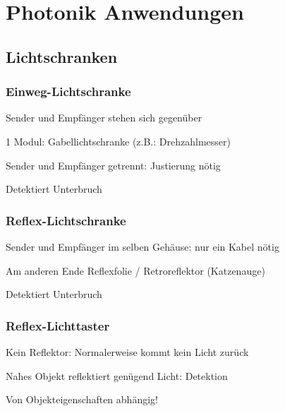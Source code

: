 \section{Photonik Anwendungen}
\subsection{Lichtschranken}
\begin{multicols}{3}
    \subsubsection{Einweg-Lichtschranke}
    \begin{compactitem}
        \item Sender und Empfänger stehen sich gegenüber
        \item 1 Modul: Gabellichtschranke (z.B.: Drehzahlmesser)
        \item Sender und Empfänger getrennt: Justierung nötig
        \item Detektiert Unterbruch
    \end{compactitem}
    
    \subsubsection{Reflex-Lichtschranke}
    \begin{compactitem}
        \item Sender und Empfänger im selben Gehäuse: nur ein Kabel nötig
        \item Am anderen Ende Reflexfolie / Retroreflektor (Katzenauge)
        \item Detektiert Unterbruch
    \end{compactitem}
    
    \subsubsection{Reflex-Lichttaster}
    \begin{compactitem}
        \item Kein Reflektor: Normalerweise kommt kein Licht zurück
        \item Nahes Objekt reflektiert genügend Licht: Detektion
        \item Von Objekteigenschaften abhängig!
    \end{compactitem}
\end{multicols}

